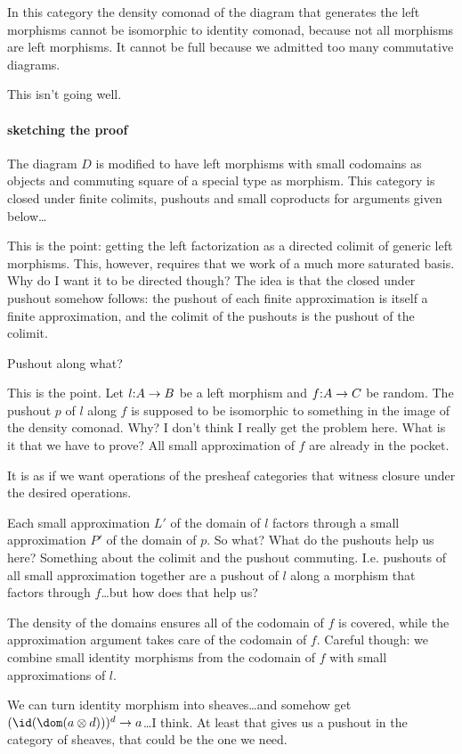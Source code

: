 \documentclass[csh.tex]{subfiles}
\begin{document}
In this category the density comonad of the diagram that generates the left morphisms cannot be isomorphic to identity comonad, because not all morphisms are left morphisms. It cannot be full because we admitted too many commutative diagrams.

This isn't going well.

\paragraph{sketching the proof}
The diagram $D$ is modified to have left morphisms with small codomains as objects and commuting square of a special type as morphism. This category is closed under finite colimits, pushouts and small coproducts for arguments given below\dots

This is the point: getting the left factorization as a directed colimit of generic left morphisms. This, however, requires that we work of a much more saturated basis. Why do I want it to be directed though?
The idea is that the closed under pushout somehow follows: the pushout of each finite approximation is itself a finite approximation, and the colimit of the pushouts is the pushout of the colimit.

Pushout along what?

This is the point. Let $l\mathord : A\to B$ be a left morphism and $f\mathord : A\to C$ be random. The pushout $p$ of $l$ along $f$ is supposed to be isomorphic to something in the image of the density comonad. Why? I don't think I really get the problem here. What is it that we have to prove?
All small approximation of $f$ are already in the pocket. 

It is as if we want operations of the presheaf categories that witness closure under the desired operations.

Each small approximation $L'$ of the domain of $l$ factors through a small approximation $P'$ of the domain of $p$. So what?
What do the pushouts help us here? Something about the colimit and the pushout commuting. I.e. pushouts of all small approximation together are a pushout of $l$ along a morphism that factors through $f$\dots but how does that help us?

The density of the domains ensures all of the codomain of $f$ is covered, while the approximation argument takes care of the codomain of $f$. Careful though: we combine small identity morphisms from the codomain of $f$ with small approximations of $l$.

We can turn identity morphism into sheaves\dots and somehow get $(\id(\dom(a\otimes d)))^d\to a$\dots I think. At least that gives us a pushout in the category of sheaves, that could be the one we need.
\end{document}
